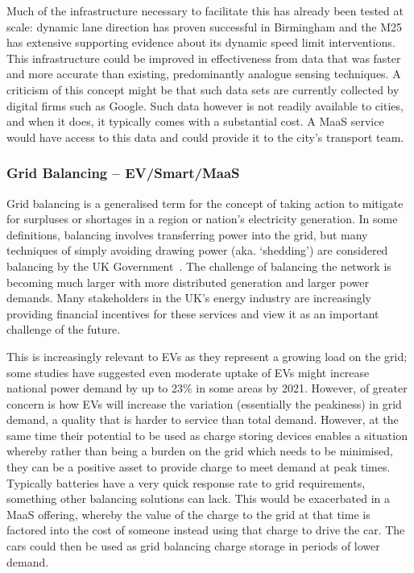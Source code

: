 \documentclass[journal]{IEEEtran}
\begin{document}
Much of the infrastructure necessary to facilitate this has already
been tested at scale: dynamic lane direction has proven successful in
Birmingham and the M25 has extensive supporting evidence about its
dynamic speed limit interventions. This infrastructure could be
improved in effectiveness from data that was faster and more accurate
than existing, predominantly analogue sensing techniques.  A criticism
of this concept might be that such data sets are currently collected
by digital firms such as Google. Such data however is not readily
available to cities, and when it does, it typically comes with a
substantial cost. A MaaS service would have access to this data
and could provide it to the city's transport team.


\subsubsection{Grid Balancing -- EV/Smart/MaaS} 

Grid balancing is a generalised term for the concept of taking action
to mitigate for surpluses or shortages in a region or nation’s
electricity generation. In some definitions, balancing involves
transferring power into the grid, but many techniques of simply
avoiding drawing power (aka. `shedding') are considered balancing by
the UK Government~\cite{decc:2014}. The challenge of balancing the
network is becoming much larger with more distributed generation and
larger power demands. Many stakeholders in the UK's energy industry
are increasingly providing financial incentives for these services and
view it as an important challenge of the future.

This is increasingly relevant to EVs as they represent a growing load
on the grid; some studies have suggested even moderate uptake of EVs
might increase national power demand by up to 23\% in some areas by
2021. However, of greater concern is how EVs will increase the
variation (essentially the peakiness) in grid demand, a quality that
is harder to service than total demand. However, at the same time
their potential to be used as charge storing devices enables a
situation whereby rather than being a burden on the grid which needs
to be minimised, they can be a positive asset to provide charge to
meet demand at peak times. Typically batteries have a very quick
response rate to grid requirements, something other balancing
solutions can lack. This would be exacerbated in a MaaS offering,
whereby the value of the charge to the grid at that time is factored
into the cost of someone instead using that charge to drive the
car. The cars could then be used as grid balancing charge storage in
periods of lower demand.
\end{document}
